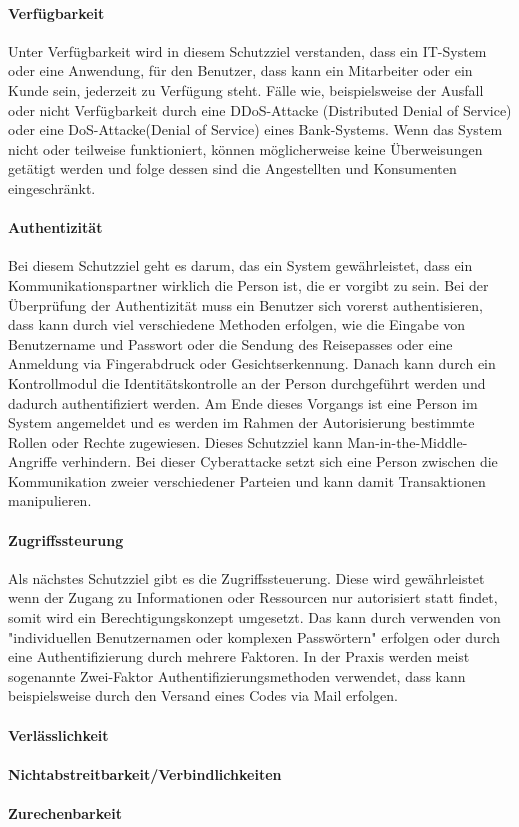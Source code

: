 \paragraph{Verfügbarkeit}
Unter Verfügbarkeit wird in diesem Schutzziel verstanden, dass ein IT-System oder eine Anwendung, für den Benutzer, dass kann ein Mitarbeiter oder ein Kunde sein, jederzeit zu Verfügung steht. Fälle wie, beispielsweise der Ausfall oder nicht Verfügbarkeit durch eine DDoS-Attacke  (Distributed Denial of Service) oder eine DoS-Attacke(Denial of Service) eines Bank-Systems. Wenn das System nicht oder teilweise funktioniert, können möglicherweise keine Überweisungen getätigt werden und folge dessen sind die Angestellten und Konsumenten eingeschränkt. 

\paragraph{Authentizität}
Bei diesem Schutzziel geht es darum, das ein System gewährleistet, dass ein Kommunikationspartner wirklich die Person ist, die er vorgibt zu sein. Bei der Überprüfung der Authentizität muss ein Benutzer sich vorerst authentisieren, dass kann durch viel verschiedene Methoden erfolgen, wie die Eingabe von Benutzername und Passwort oder die Sendung des Reisepasses oder eine Anmeldung via Fingerabdruck oder Gesichtserkennung. Danach kann durch ein Kontrollmodul die Identitätskontrolle an der Person durchgeführt werden und dadurch authentifiziert werden. Am Ende dieses Vorgangs ist eine Person im System angemeldet und es werden im Rahmen der Autorisierung bestimmte Rollen oder Rechte zugewiesen.
Dieses Schutzziel kann Man-in-the-Middle-Angriffe verhindern. Bei dieser Cyberattacke setzt sich eine Person zwischen die Kommunikation zweier verschiedener Parteien und kann damit Transaktionen manipulieren. 

\paragraph{Zugriffssteurung}
Als nächstes Schutzziel gibt es die Zugriffssteuerung. Diese wird gewährleistet wenn der Zugang zu Informationen oder Ressourcen nur autorisiert statt findet, somit wird ein Berechtigungskonzept umgesetzt. Das kann durch verwenden von "individuellen Benutzernamen oder komplexen Passwörtern" erfolgen oder durch eine Authentifizierung durch mehrere Faktoren. In der Praxis werden meist sogenannte Zwei-Faktor Authentifizierungsmethoden verwendet, dass kann beispielsweise durch den Versand eines Codes via Mail erfolgen.

\paragraph{Verlässlichkeit}

\paragraph{Nichtabstreitbarkeit/Verbindlichkeiten}

\paragraph{Zurechenbarkeit}


\newpage